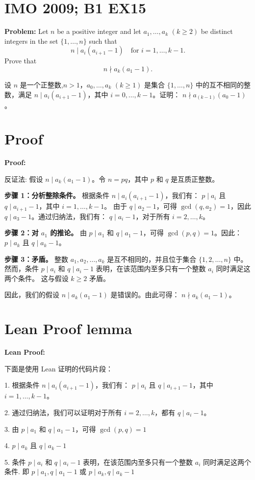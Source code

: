 \documentclass[a4paper]{article}
\begin{document}
\section*{IMO 2009; B1 EX15}
    \textbf{Problem:}
    Let $n$ be a positive integer and let $a_1,\ldots,a_k$ $(k \geq 2)$ be distinct integers in the set $\{1,\ldots,n\}$ such that 
    \[n \mid a_i(a_{i+1}-1) \quad \text{for } i = 1,\ldots,k-1.\]
    Prove that 
    \[n \nmid a_k(a_1-1).\]

    \[ \]
    设 $n$ 是一个正整数,$n > 1$，$a_0, \ldots, a_k$ $(k \geq 1)$ 是集合 $\{1, \ldots, n\}$ 中的互不相同的整数，满足
    $n \mid a_i(a_{i+1}-1)$，其中 $i = 0, \ldots, k-1$。证明：
    $n \nmid a_(k-1)(a_0-1)$。


\section*{Proof}
    \textbf{Proof:}

    反证法: 假设 $n \mid a_k(a_1-1)$。令 $n = pq$，其中 $p$ 和 $q$ 是互质正整数。

    \textbf{步骤 1：分析整除条件。}  
    根据条件 $n \mid a_i(a_{i+1}-1)$，我们有：
    $p \mid a_i$ 且 $q \mid a_{i+1}-1$，其中 $i = 1, \ldots, k-1$。
    由于 $q \mid a_2-1$，可得 $\gcd(q, a_2) = 1$，因此 $q \mid a_3-1$。通过归纳法，我们有：
    $q \mid a_i-1$，对于所有 $i = 2, \ldots, k$。

    \textbf{步骤 2：对 $a_1$ 的推论。}  
    由 $p \mid a_1$ 和 $q \mid a_1-1$，可得 $\gcd(p, q) = 1$。因此：
    $p \mid a_k$ 且 $q \mid a_k-1$。

    \textbf{步骤 3：矛盾。}  
    整数 $a_1, a_2, \ldots, a_k$ 是互不相同的，并且位于集合 $\{1, 2, \ldots, n\}$ 中。
    然而，条件 $p \mid a_i$ 和 $q \mid a_i-1$ 表明，在该范围内至多只有一个整数 $a_i$ 同时满足这两个条件。
    这与假设 $k \geq 2$ 矛盾。

    因此，我们的假设 $n \mid a_k(a_1-1)$ 是错误的。由此可得：
    $n \nmid a_k(a_1-1)$。

\section*{Lean Proof lemma}
    \textbf{Lean Proof:}

    下面是使用 Lean 证明的代码片段：

    1. 根据条件 $n \mid a_i(a_{i+1}-1)$，我们有：
    $p \mid a_i$ 且 $q \mid a_{i+1}-1$，其中 $i = 1, \ldots, k-1$。

    2. 通过归纳法，我们可以证明对于所有 $i = 2, \ldots, k$，都有 $q \mid a_i-1$。

    3. 由 $p \mid a_1$ 和 $q \mid a_1-1$，可得 $\gcd(p, q) = 1$

    4. $p \mid a_k$ 且 $q \mid a_k-1$

    5. 条件 $p \mid a_i$ 和 $q \mid a_i-1$ 表明，在该范围内至多只有一个整数 $a_i$ 同时满足这两个条件.
    即 $p \mid a_1, q \mid a_1-1$ 或 $p \mid a_k, q \mid a_k-1$
    
\end{document}
